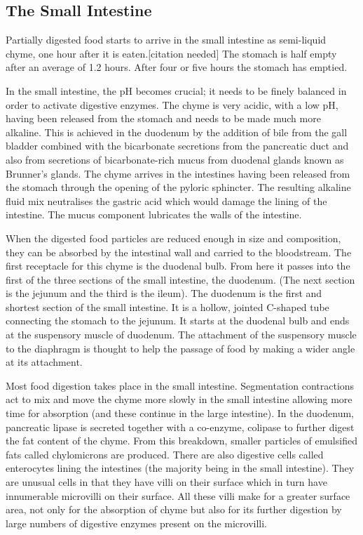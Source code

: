 \hypertarget{the-small-intestine}{%
\subsection{The Small Intestine}\label{the-small-intestine}}

Partially digested food starts to arrive in the small intestine as semi-liquid chyme, one hour after it is eaten.{[}citation needed{]} The stomach is half empty after an average of 1.2 hours. After four or five hours the stomach has emptied.

In the small intestine, the pH becomes crucial; it needs to be finely balanced in order to activate digestive enzymes. The chyme is very acidic, with a low pH, having been released from the stomach and needs to be made much more alkaline. This is achieved in the duodenum by the addition of bile from the gall bladder combined with the bicarbonate secretions from the pancreatic duct and also from secretions of bicarbonate-rich mucus from duodenal glands known as Brunner's glands. The chyme arrives in the intestines having been released from the stomach through the opening of the pyloric sphincter. The resulting alkaline fluid mix neutralises the gastric acid which would damage the lining of the intestine. The mucus component lubricates the walls of the intestine.

When the digested food particles are reduced enough in size and composition, they can be absorbed by the intestinal wall and carried to the bloodstream. The first receptacle for this chyme is the duodenal bulb. From here it passes into the first of the three sections of the small intestine, the duodenum. (The next section is the jejunum and the third is the ileum). The duodenum is the first and shortest section of the small intestine. It is a hollow, jointed C-shaped tube connecting the stomach to the jejunum. It starts at the duodenal bulb and ends at the suspensory muscle of duodenum. The attachment of the suspensory muscle to the diaphragm is thought to help the passage of food by making a wider angle at its attachment.

Most food digestion takes place in the small intestine. Segmentation contractions act to mix and move the chyme more slowly in the small intestine allowing more time for absorption (and these continue in the large intestine). In the duodenum, pancreatic lipase is secreted together with a co-enzyme, colipase to further digest the fat content of the chyme. From this breakdown, smaller particles of emulsified fats called chylomicrons are produced. There are also digestive cells called enterocytes lining the intestines (the majority being in the small intestine). They are unusual cells in that they have villi on their surface which in turn have innumerable microvilli on their surface. All these villi make for a greater surface area, not only for the absorption of chyme but also for its further digestion by large numbers of digestive enzymes present on the microvilli.

